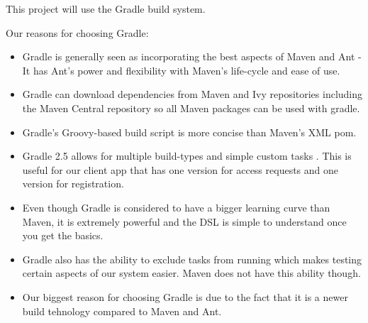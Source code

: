 This project will use the Gradle build system.

Our reasons for choosing Gradle:
\begin{itemize}
	\item Gradle is generally seen as incorporating the best aspects of Maven and Ant -  It has Ant’s power and flexibility with Maven’s life-cycle and ease of use. \cite{Farcic2014, Timosin2013}
	\item Gradle can download dependencies from Maven and Ivy repositories including the Maven Central repository so all Maven packages can be used with gradle. \cite{GradleDocChap8}
	\item Gradle's Groovy-based build script is more concise than Maven's XML pom. \cite{Farcic2014}
	\item Gradle 2.5 allows for multiple build-types and simple custom tasks \cite{GradleChap55}. This is useful for our client app that has one version for access requests and one version for registration.
	\item Even though Gradle is considered to have a bigger learning curve than Maven, it is extremely powerful \cite{Timosin2013} and the DSL is simple to understand once you get the basics. \cite{Farcic2014}
	\item Gradle also has the ability to exclude tasks from running which makes testing certain aspects of our system easier. Maven does not have this ability though.
	\item Our biggest reason for choosing Gradle is due to the fact that it is a newer build tehnology compared to Maven and Ant. 
\end{itemize}


